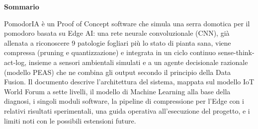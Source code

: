 \documentclass[11pt,a4paper]{article}
\begin{document}


\newpage
\begin{center}
{\Large\bfseries Sommario}
\end{center}
\vspace{0.4cm}
\noindent
PomodorIA è un Proof of Concept software che simula una serra domotica per
il pomodoro basata su Edge AI: una rete neurale convoluzionale (CNN),
già allenata a riconoscere 9 patologie fogliari più lo stato di pianta sana,
viene compressa (pruning e quantizzazione) e integrata in un ciclo continuo
sense-think-act-log, insieme a sensori ambientali simulati e a un agente
decisionale razionale (modello PEAS) che ne combina gli output secondo il
principio della Data Fusion. Il documento descrive l'architettura del
sistema, mappata sul modello IoT World Forum a sette livelli, il modello di
Machine Learning alla base della diagnosi, i singoli moduli software, la
pipeline di compressione per l'Edge con i relativi risultati sperimentali,
una guida operativa all'esecuzione del progetto, e i limiti noti con le
possibili estensioni future.

\newpage
\tableofcontents












\end{document}
